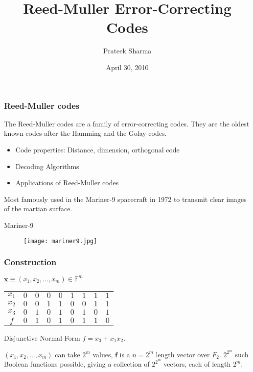 \documentclass{beamer}
\title{Reed-Muller Error-Correcting Codes}
\author{Prateek Sharma}
\date{April 30, 2010}
\newcommand{\rem}{Reed-Muller}
\newcommand{\F}{\ensuremath{\mathbb{F}}}
\newcommand{\V}[1]{\ensuremath{\mathbf{#1}}}
\begin{document}
\maketitle



\begin{frame}
 \frametitle{Reed-Muller codes}
\begin{}
The Reed-Muller codes are a family of error-correcting codes. They are
the oldest known codes after the Hamming and the Golay codes.
\end{}

\begin{itemize}
In this talk:
\item Code properties: Distance, dimension, orthogonal code
\item Decoding Algorithms 
\item Applications of \rem{} codes
\end{itemize}

Most famously used in the Mariner-9 spacecraft in 1972 to transmit clear images of the martian surface.
\end{frame}



\begin{frame}{Mariner-9}
\begin{figure}
   \texttt{[image: mariner9.jpg]}
\end{figure}

\end{frame}



\begin{frame}

\frametitle{Construction}
$\V{x} \equiv (x_1,x_2,\ldots,x_m) \in \F^m$
\newline

\begin {center}
\begin{tabular}{|c|c|c|c|c|c|c|c|c|}
\hline
$x_1$ & $0$ & $0$ & $0$ & $0$ & $1$ & $1$ & $1$ & $1$ \\
$x_2$ & $0$ & $0$ & $1$ & $1$ & $0$ & $0$ & $1$ & $1$ \\
$x_3$ & $0$ & $1$ & $0$ & $1$ & $0$ & $1$ & $0$ & $1$ \\
\hline
$f$   & $0$ & $1$ & $0$ & $1$ & $0$ & $1$ & $1$ & $0$ \\
\hline
\end{tabular}
\end{center} 

Disjunctive Normal Form
$f = x_3 + x_1x_2$.

$(x_1,x_2,\ldots,x_m)$ can take $2^m$ values, $\V{f}$ is a $n=2^m$
length vector over $F_2$.
$2^{2^m}$ such Boolean functions possible, giving a collection of  $2^{2^m}$ vectors, each of length $2^m$.

\end{frame}
\end{document}
